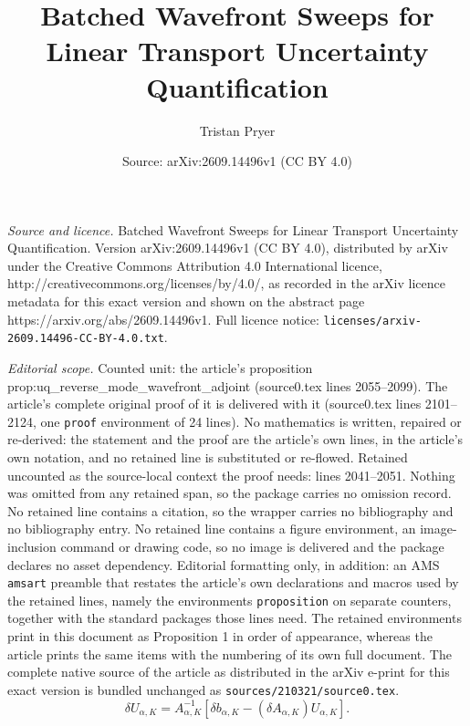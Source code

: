 \documentclass[10pt,a4paper]{amsart}
\title{Batched Wavefront Sweeps for Linear Transport Uncertainty Quantification}
\author{Tristan Pryer}
\date{Source: arXiv:2609.14496v1 (CC BY 4.0)}
\newcommand{\qb}[1]{\ensuremath{\!\left[{#1}\right]}}
\begin{document}
\maketitle

\noindent\emph{Source and licence.} Batched Wavefront Sweeps for Linear Transport Uncertainty Quantification. Version arXiv:2609.14496v1 (CC BY 4.0), distributed by arXiv under the Creative Commons Attribution 4.0 International licence, http://creativecommons.org/licenses/by/4.0/, as recorded in the arXiv licence metadata for this exact version and shown on the abstract page https://arxiv.org/abs/2609.14496v1. Full licence notice: \texttt{licenses/arxiv-2609.14496-CC-BY-4.0.txt}.\par\smallskip

\noindent\textit{Editorial scope.} Counted unit: the article's proposition prop:uq\_reverse\_mode\_wavefront\_adjoint (source0.tex lines 2055--2099). The article's complete original proof of it is delivered with it (source0.tex lines 2101--2124, one \texttt{proof} environment of 24 lines). No mathematics is written, repaired or re-derived: the statement and the proof are the article's own lines, in the article's own notation, and no retained line is substituted or re-flowed.  Retained uncounted as the source-local context the proof needs: lines 2041--2051.  Nothing was omitted from any retained span, so the package carries no omission record.  No retained line contains a citation, so the wrapper carries no bibliography and no bibliography entry.  No retained line contains a figure environment, an image-inclusion command or drawing code, so no image is delivered and the package declares no asset dependency.  Editorial formatting only, in addition: an AMS \texttt{amsart} preamble that restates the article's own declarations and macros used by the retained lines, namely the environments \texttt{proposition} on separate counters, together with the standard packages those lines need.  The retained environments print in this document as Proposition 1 in order of appearance, whereas the article prints the same items with the numbering of its own full document.  The complete native source of the article as distributed in the arXiv e-print for this exact version is bundled unchanged as \texttt{sources/210321/source0.tex}.
\begin{equation}
  \delta U_{\alpha,K}
  =
  A_{\alpha,K}^{-1}
  \qb{
    \delta b_{\alpha,K}
    -
    (\delta A_{\alpha,K})U_{\alpha,K}
  }.
  \label{eq:uq_local_solve_derivative}
\end{equation}
\end{document}
